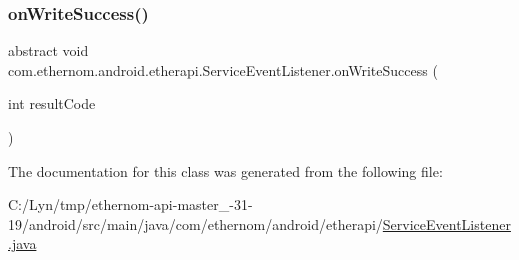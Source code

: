 \subsubsection{\texorpdfstring{on\+Write\+Success()}{onWriteSuccess()}}
{\footnotesize\ttfamily abstract void com.\+ethernom.\+android.\+etherapi.\+Service\+Event\+Listener.\+on\+Write\+Success (\begin{DoxyParamCaption}\item[{int}]{result\+Code }\end{DoxyParamCaption})\hspace{0.3cm}{\ttfamily [abstract]}}



The documentation for this class was generated from the following file\+:\begin{DoxyCompactItemize}
\item 
C\+:/\+Lyn/tmp/ethernom-\/api-\/master\+\_-\/31-\/19/android/src/main/java/com/ethernom/android/etherapi/\mbox{\hyperlink{_service_event_listener_8java}{Service\+Event\+Listener.\+java}}\end{DoxyCompactItemize}

